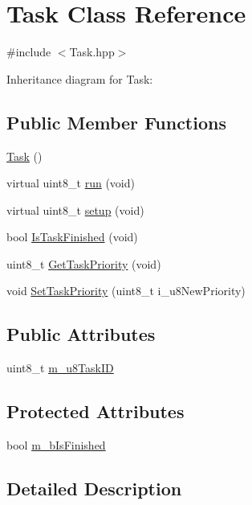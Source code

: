 \hypertarget{class_task}{}\section{Task Class Reference}
\label{class_task}


{\ttfamily \#include $<$Task.\+hpp$>$}



Inheritance diagram for Task\+:
\subsection*{Public Member Functions}
\begin{DoxyCompactItemize}
\item 
\hyperlink{class_task_a0ca53354bdc006762a0fda68c64f7608}{Task} ()
\item 
virtual uint8\+\_\+t \hyperlink{class_task_abba587a0cce2fecd9dc38011f6c484da}{run} (void)
\item 
virtual uint8\+\_\+t \hyperlink{class_task_a923b84dacf9e982daabd09d2476427fa}{setup} (void)
\item 
bool \hyperlink{class_task_aaf7d64a01c05a6b15beb0907d96a400c}{Is\+Task\+Finished} (void)
\item 
uint8\+\_\+t \hyperlink{class_task_a68611d58f8977ea9afc5735c8cd0ce76}{Get\+Task\+Priority} (void)
\item 
void \hyperlink{class_task_a45ef14b69006ac405aea11bb680bb866}{Set\+Task\+Priority} (uint8\+\_\+t i\+\_\+u8\+New\+Priority)
\end{DoxyCompactItemize}
\subsection*{Public Attributes}
\begin{DoxyCompactItemize}
\item 
uint8\+\_\+t \hyperlink{class_task_aad8b8f71410b4593b6bee020cfd42174}{m\+\_\+u8\+Task\+ID}
\end{DoxyCompactItemize}
\subsection*{Protected Attributes}
\begin{DoxyCompactItemize}
\item 
bool \hyperlink{class_task_a0adbc8e71d289d9e21bfe8b31b8bb86a}{m\+\_\+b\+Is\+Finished}
\end{DoxyCompactItemize}


\subsection{Detailed Description}


